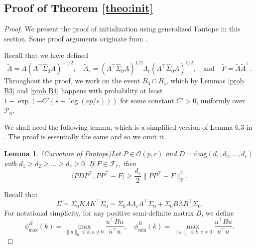 \documentclass[11pt]{article}
\newcommand{\LambdaRest}{\overline{\Lambda}} %
\newcommand{\0}{{\mathbf{0}}}
\newcommand{\tA}{{\widetilde{A}}}
\newcommand{\tF}{{\widetilde{F}}}
\newcommand{\tlambda}{{\widetilde{\Lambda}_r}}
\newtheorem{lemma}[theorem]{Lemma}
\begin{document}
\subsection{Proof of Theorem \ref{theo:init}}
\begin{proof}
We present the proof of initialization using generalized Fantope in this section. Some proof arguments originate from \cite{gao2017sparse}.

Recall that we have defined 
\begin{equation}
      \label{eq:tA-tF}
\tA=A(A^\top  \widehat{\Sigma}_0A)^{-1/2}, \quad
\tlambda=(A^\top  \widehat{\Sigma}_0A)^{1/2}\Lambda_r(A^\top  \widehat{\Sigma}_0A)^{1/2},\quad
\mbox{and}
\quad
\tF=\tA\tA^\top.
\end{equation}
Throughout the proof, we work on the event  $B_3\cap B_4$, which by Lemmas \ref{prob B3} and \ref{prob B4} happens with probability at least $1-\exp(-C'(s+\log(ep/s)))$ for some constant $C'>0$, {  uniformly over $\mathcal{P}_n$}.




We shall need the following lemma, which is a simplified version of Lemma 6.3 in \cite{gao2017sparse}. 
The proof is essentially the same and so we omit it.
\begin{lemma}(Curvature of Fantope)\label{cur fantope}
Let $P\in \mathcal{O}(p,r)$ and $D=\mathrm{diag}(d_1,d_2,...,d_r)$ with $d_1\geq d_2\geq...\geq d_r\geq 0.$ If $F\in \mathcal{F}_r$, then\begin{equation*}
    \langle PDP^\top, PP^\top-F\rangle\geq \frac{d_r}{2}\|PP^\top-F\|_\mathrm{F}^2.
\end{equation*}
\end{lemma}
Recall that
\begin{equation*}
    \Sigma=\Sigma_0 K\Lambda K^\top  \Sigma_0=\Sigma_0 A\Lambda_r A^\top  \Sigma_0+\Sigma_0 B\LambdaRest B^\top  \Sigma_0.
\end{equation*}
For notational simplicity, for any positive semi-definite matrix $B$, we define\begin{equation*}
    \phi_{\text{max}}^B(k)=\max_{\|u\|_0\leq k, u\neq 0}\frac{u^\top  Bu}{u^\top  u},\quad
    \phi_{\text{min}}^B(k)=\max_{\|u\|_0\leq k, u\neq 0}\frac{u^\top  Bu}{u^\top  u}.
\end{equation*}


\end{proof}
\end{document}
